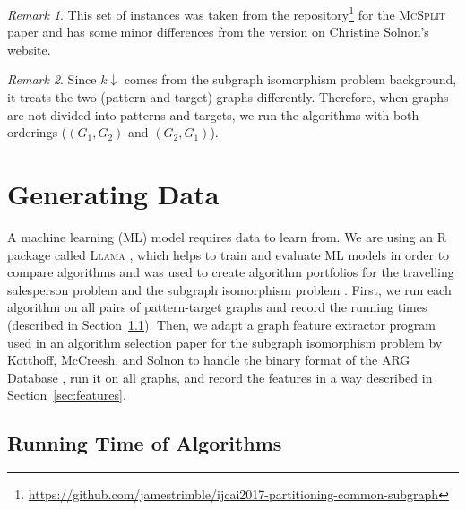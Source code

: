 \documentclass{l4proj}
\theoremstyle{definition}
\theoremstyle{remark}
\newtheorem{remark}{Remark}[chapter]
\begin{document}
\begin{remark}
This set of instances was taken from the
repository\footnote{\url{https://github.com/jamestrimble/ijcai2017-partitioning-common-subgraph}}
for the \textsc{McSplit} paper \cite{DBLP:conf/ijcai/McCreeshPT17} and has some
minor differences from the version on Christine Solnon's website.
\end{remark}

\begin{remark}
  Since $k{\downarrow}$ comes from the subgraph isomorphism problem background, it
  treats the two (pattern and target) graphs differently. Therefore, when graphs
  are not divided into patterns and targets, we run the algorithms with both
  orderings ($(G_1, G_2)$ and $(G_2, G_1)$).
\end{remark}

\chapter{Generating Data} \label{chapter:generating_data}

A machine learning (ML) model requires data to learn from. We are using an R
package called \textsc{Llama} \cite{kotthoff_llama_2013, llama}, which helps to train
and evaluate ML models in order to compare algorithms and was used to create
algorithm portfolios for the travelling salesperson problem
\cite{DBLP:conf/lion/KotthoffKHT15} and the subgraph isomorphism problem
\cite{DBLP:conf/lion/KotthoffMS16}. First, we run each algorithm on all pairs of
pattern-target graphs and record the running times (described in
Section~\ref{sec:runtimes}). Then, we adapt a graph feature extractor program
used in an algorithm selection paper for the subgraph isomorphism problem by
Kotthoff, McCreesh, and Solnon \cite{DBLP:conf/lion/KotthoffMS16} to handle the
binary format of the ARG Database \cite{foggia2001-2,
  DBLP:journals/prl/SantoFSV03}, run it on all graphs, and record the features
in a way described in Section~\ref{sec:features}.

\section{Running Time of Algorithms} \label{sec:runtimes}
\end{document}
